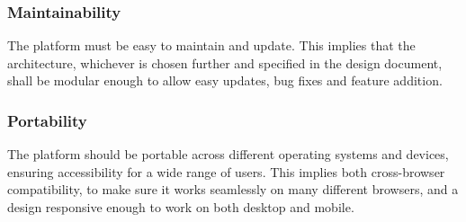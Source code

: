 \subsubsection{Maintainability}
The platform must be easy to maintain and update. This implies that the architecture, whichever is chosen further and specified in the design document, shall be modular enough to allow easy updates, bug fixes and feature addition. 

\subsubsection{Portability}
The platform should be portable across different operating systems and devices, ensuring accessibility for a wide range of users. This implies both cross-browser compatibility, to make sure it works seamlessly on many different browsers, and a design responsive enough to work on both desktop and mobile.

